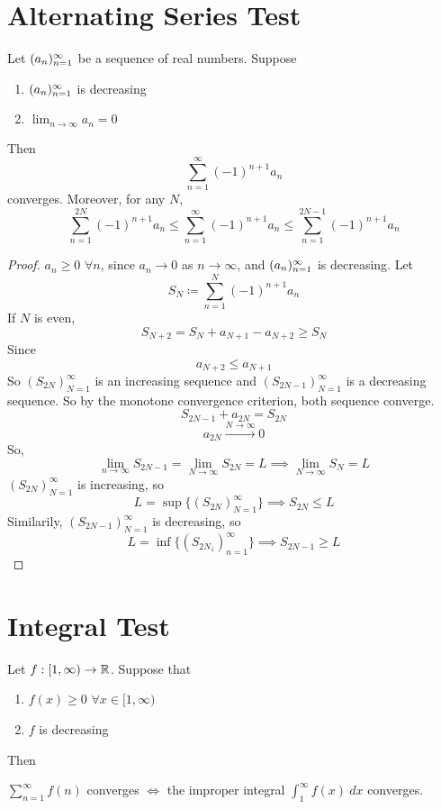 \documentclass[openany]{report}
\begin{document}
\section{Alternating Series Test}
\begin{prop}
    Let $({a}_n)_{n=1}^\infty$ be a sequence of real numbers. Suppose
    \begin{enumerate}[label=(\roman*)]
        \item $({a}_n)_{n=1}^\infty$ is decreasing
        \item $\lim_{n\rightarrow \infty} a_n = 0$
    \end{enumerate}
    Then 
    \[\sum_{n=1}^\infty (-1)^{n+1}a_n\]
    converges. Moreover, for any $N$, 
    \[\sum_{n=1}^{2N} (-1)^{n+1}a_n \leq \sum_{n=1}^\infty (-1)^{n+1}a_n \leq \sum_{n=1}^{2N-1} (-1)^{n+1}a_n\]
\end{prop}
\begin{proof}
    $a_n \geq 0$ $\forall n$, since $a_n \rightarrow 0$ as $n \rightarrow \infty$, and $({a}_n)_{n=1}^\infty$ is decreasing. Let
    \[S_N \coloneqq \sum_{n=1}^N (-1)^{n+1}a_n\]
    If $N$ is even, 
    \[S_{N+2} = S_N + a_{N+1} - a_{N+2} \geq S_N\]
    Since 
    \[a_{N+2} \leq a_{N+1}\]
    So $(S_{2N})_{N=1}^\infty$ is an increasing sequence and $(S_{2N -1})_{N=1}^\infty$ is a decreasing sequence. So by the monotone convergence criterion, both sequence converge. 
    \[S_{2N - 1} + a_{2N} = S_{2N}\]
    \[a_{2N} \xrightarrow{N \rightarrow \infty} 0 \]
    So, 
    \[\lim_{n\rightarrow \infty} S_{2N-1} = \lim_{N \rightarrow \infty} S_{2N} = L \implies \lim_{N\rightarrow \infty} S_N = L\]
    $(S_{2N})^\infty_{N=1}$ is increasing, so 
    \[L = \sup \{(S_{2N})_{N=1}^\infty\} \implies S_{2N} \leq L\]
    Similarily, $(S_{2N-1})^\infty_{N=1}$ is decreasing, so
    \[L = \inf\{(S_{2N_1})_{n=1}^\infty\} \implies S_{2N - 1} \geq L\] 

\end{proof}

\section{Integral Test}

\begin{prop}
    Let $f: [1,\infty) \rightarrow \mathbb{R}$. Suppose that
    \begin{enumerate}[label=(\roman*)]
        \item $f(x) \geq 0$ $\forall x \in [1,\infty)$
        \item $f$ is decreasing
    \end{enumerate}
    Then 
    \begin{center}
        $\sum_{n=1}^\infty f(n)$ converges $\iff$ the improper integral $\int_1^\infty f(x) \ dx$ converges.
    \end{center}
\end{prop}
\end{document}
